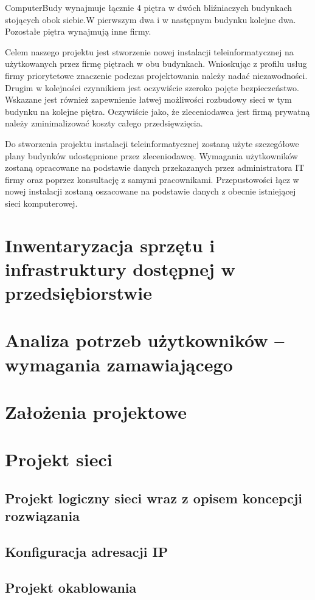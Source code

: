 \documentclass{report}
\begin{document}
ComputerBudy wynajmuje łącznie 4 piętra w dwóch bliźniaczych budynkach stojących obok siebie.W pierwszym dwa i w następnym budynku kolejne dwa.
Pozostałe piętra wynajmują inne firmy.

Celem naszego projektu jest stworzenie nowej instalacji teleinformatycznej na użytkowanych przez firmę piętrach w obu budynkach. Wnioskując z
profilu usług firmy priorytetowe znaczenie podczas projektowania należy nadać niezawodności. Drugim w kolejności czynnikiem jest oczywiście
szeroko pojęte bezpieczeństwo. Wskazane jest również zapewnienie łatwej możliwości rozbudowy sieci w tym budynku na kolejne piętra.
Oczywiście jako, że zleceniodawca jest firmą prywatną należy zminimalizować koszty całego przedsięwzięcia.

Do stworzenia projektu instalacji teleinformatycznej zostaną użyte szczegółowe plany budynków udostępnione przez zleceniodawcę.
Wymagania użytkowników zostaną opracowane na podstawie danych przekazanych przez administratora IT firmy oraz poprzez konsultację
z samymi pracownikami. Przepustowości łącz w nowej instalacji zostaną oszacowane na podstawie danych z obecnie istniejącej sieci komputerowej.

\chapter{Inwentaryzacja sprzętu i infrastruktury dostępnej w przedsiębiorstwie}
\chapter{Analiza potrzeb użytkowników – wymagania zamawiającego}
\chapter{Założenia projektowe}
\chapter{Projekt sieci}
\section{Projekt logiczny sieci wraz z opisem koncepcji rozwiązania}
\section{Konfiguracja adresacji IP}
\section{Projekt okablowania}
\end{document}
